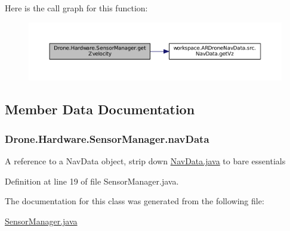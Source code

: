 Here is the call graph for this function\+:\nopagebreak
\begin{figure}[H]
\begin{center}
\leavevmode
\includegraphics[width=350pt]{class_drone_1_1_hardware_1_1_sensor_manager_ab0af3ec601df9430e21a11205afa32a9_cgraph}
\end{center}
\end{figure}




\subsection{Member Data Documentation}
\hypertarget{class_drone_1_1_hardware_1_1_sensor_manager_af52c954878df8ae3ffd3984ea9631048}{}
\subsubsection[{nav\+Data}]{ Drone.\+Hardware.\+Sensor\+Manager.\+nav\+Data\hspace{0.3cm}{\ttfamily [private]}}\label{class_drone_1_1_hardware_1_1_sensor_manager_af52c954878df8ae3ffd3984ea9631048}
A reference to a Nav\+Data object,  strip down \hyperlink{_nav_data_8java}{Nav\+Data.\+java} to bare essentials 

Definition at line 19 of file Sensor\+Manager.\+java.



The documentation for this class was generated from the following file\+:\begin{DoxyCompactItemize}
\item 
\hyperlink{_sensor_manager_8java}{Sensor\+Manager.\+java}\end{DoxyCompactItemize}
